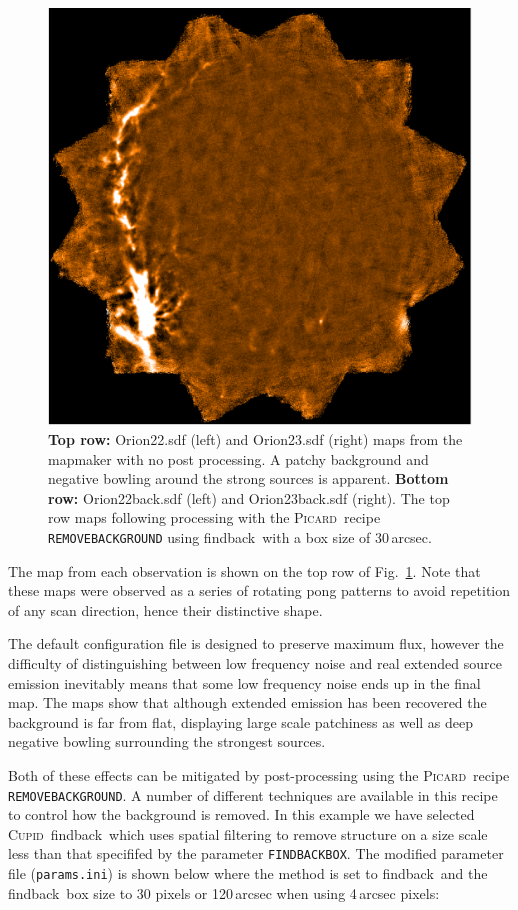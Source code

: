 \documentclass[twoside,11pt]{article}
\newcommand{\xref}[3]{#1}
\renewcommand{\_}{\texttt{\symbol{95}}}
\newcommand{\cupid}{\xref{\textsc{Cupid}}{sun255}{}}
\newcommand{\picard}{\xref{\textsc{Picard}}{sun231}{}}
\newcommand{\drrecipe}[1]{\texttt{#1}}
\newcommand{\task}[1]{\textsf{#1}}
\newcommand{\param}[1]{\texttt{#1}}
\newcommand{\findback}{\xref{\task{findback}}{sun255}{FINDBACK}}
\begin{document}
\begin{figure}
\begin{center}
\includegraphics[width=0.49\hsize]{sc19_map23_back.eps}
\caption{{\bf Top row:} Orion22.sdf (left) and Orion23.sdf (right) maps from
  the mapmaker with no post processing. A patchy background and
  negative bowling around the strong sources is apparent. {\bf Bottom row:}
  Orion22\_back.sdf (left) and Orion23\_back.sdf (right). The top row
  maps following processing with the \picard\ recipe \drrecipe{REMOVE\_BACKGROUND}
  using \findback\ with a box size of 30\,arcsec.}
\label{fig:orionmakemap}
\end{center}
\end{figure}

The map from each observation is shown on the top row of
Fig.~\ref{fig:orionmakemap}. Note that these maps were observed as a
series of rotating pong patterns to avoid repetition of any scan
direction, hence their distinctive shape.

The default configuration file is designed to preserve maximum flux,
however the difficulty of distinguishing between low frequency noise
and real extended source emission inevitably means that some low
frequency noise ends up in the final map. The maps show that although
extended emission has been recovered the background is far from flat,
displaying large scale patchiness as well as deep negative bowling
surrounding the strongest sources.

Both of these effects can be mitigated by post-processing
using the \picard\ recipe \drrecipe{REMOVE\_BACKGROUND}. A number of
different techniques are available in this recipe to control how the
background is removed.  In this example we have selected \cupid\
\findback\ which uses spatial filtering to remove structure on a size
scale less than that specififed by the
parameter \param{FINDBACK\_BOX}.  The modified parameter file
(\texttt{params.ini}) is shown below where the method is set to
\findback\ and the \findback\ box size to 30 pixels or 120\,arcsec
when using 4\,arcsec pixels:
\end{document}
